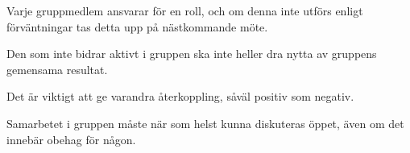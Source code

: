 \documentclass[11pt]{article}
\begin{document}
\begin{flushleft}
Varje gruppmedlem ansvarar för en roll, och om denna inte utförs enligt förväntningar tas detta upp på nästkommande möte.

Den som inte bidrar aktivt i gruppen ska inte heller dra nytta av gruppens gemensama resultat.

Det är viktigt att ge varandra återkoppling, såväl positiv som negativ.

Samarbetet i gruppen måste när som helst kunna diskuteras öppet, även om det innebär obehag för någon. 

\end{flushleft}
\end{document}
